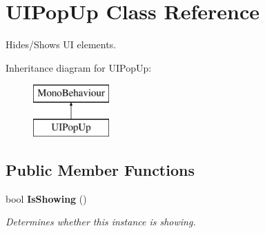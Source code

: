 \section{U\+I\+Pop\+Up Class Reference}
\label{class_u_i_pop_up}


Hides/\+Shows UI elements.  


Inheritance diagram for U\+I\+Pop\+Up\+:\begin{figure}[H]
\begin{center}
\leavevmode
\includegraphics[height=2.000000cm]{class_u_i_pop_up}
\end{center}
\end{figure}
\subsection*{Public Member Functions}
\begin{DoxyCompactItemize}
\item 
bool {\bf Is\+Showing} ()
\begin{DoxyCompactList}\small\item\em Determines whether this instance is showing. \end{DoxyCompactList}\end{DoxyCompactItemize}
